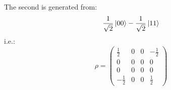 \documentclass{article}
\begin{document}
The second is generated from:
\begin{equation}
	\frac{1}{\sqrt{2}} \ket{00} - \frac{1}{\sqrt{2}} \ket{11}
\end{equation}
i.e.:
\begin{equation}
	\rho = \left(
	\begin{array}{cccc}
	\frac{1}{2} & 0 & 0 & -\frac{1}{2} \\ 
	0 & 0 & 0 & 0 \\ 
	0 & 0 & 0 & 0 \\ 
	-\frac{1}{2} & 0 & 0 & \frac{1}{2}
	\end{array} 
	\right)
\end{equation}
\end{document}
